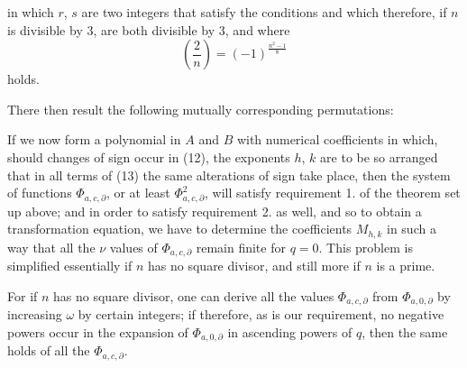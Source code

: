 in which $r$, $s$ are two integers that satisfy the conditions
and which therefore, if $n$ is divisible by 3, are both divisible
by 3, and where
\[ \left(\frac{2}{n}\right) = (-1)^{\frac{n^2-1}{8}} \]
holds.

There then result the following mutually corresponding permutations:

If we now form a polynomial in $A$ and $B$ with numerical
coefficients
in which, should changes of sign occur in (12), the exponents
$h$, $k$ are to be so arranged that in all terms of (13)
the same alterations of sign take place, then the system
of functions $\Phi_{a,c,\partial}$, or at least $\Phi^2_{a,c,\partial}$, will satisfy requirement 1.
of the theorem set up above; and in order to satisfy
requirement 2. as well, and so to obtain a transformation equation, we have to determine the coefficients $M_{h,k}$ in such a way
that all the $\nu$ values of $\Phi_{a,c,\partial}$ remain finite for $q=0$.
This problem is simplified essentially if $n$ has no square divisor, and still more if $n$ is a prime.

For if $n$ has no square divisor, one can derive all the
values $\Phi_{a,c,\partial}$ from $\Phi_{a,0,\partial}$ by increasing
$\omega$ by certain integers; if therefore, as is our requirement, no negative powers occur in the expansion of $\Phi_{a,0,\partial}$ %
in ascending powers
of $q$, then the same holds
of all the $\Phi_{a,c,\partial}$.
